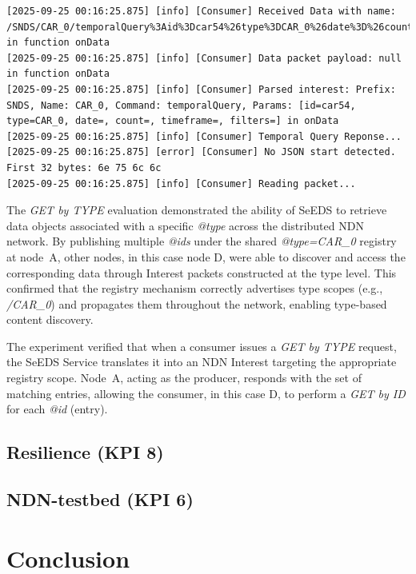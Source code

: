 \documentclass{article}
\begin{document}
\begin{lstlisting}[language=log, caption={D's log after receiving the registry payload, which are the \textit{@ids}, and performing a \emph{GET by ID} for each},label={lst:get-by-id-after-get-by-type-d}]
[2025-09-25 00:16:25.875] [info] [Consumer] Received Data with name: /SNDS/CAR_0/temporalQuery%3Aid%3Dcar54%26type%3DCAR_0%26date%3D%26count%3D%26timeframe%3D%26filters%3D in function onData
[2025-09-25 00:16:25.875] [info] [Consumer] Data packet payload: null in function onData
[2025-09-25 00:16:25.875] [info] [Consumer] Parsed interest: Prefix: SNDS, Name: CAR_0, Command: temporalQuery, Params: [id=car54, type=CAR_0, date=, count=, timeframe=, filters=] in onData
[2025-09-25 00:16:25.875] [info] [Consumer] Temporal Query Reponse...
[2025-09-25 00:16:25.875] [error] [Consumer] No JSON start detected. First 32 bytes: 6e 75 6c 6c 
[2025-09-25 00:16:25.875] [info] [Consumer] Reading packet...
\end{lstlisting}

The \textit{GET by TYPE} evaluation demonstrated the ability of SeEDS to retrieve data objects associated with a specific \textit{@type} across the distributed NDN network. By publishing multiple \textit{@ids} under the shared \textit{@type=CAR\_0} registry at node~A, other nodes, in this case node D, were able to discover and access the corresponding data through Interest packets constructed at the type level. This confirmed that the registry mechanism correctly advertises type scopes (e.g., \textit{/CAR\_0}) and propagates them throughout the network, enabling type-based content discovery.

The experiment verified that when a consumer issues a \textit{GET by TYPE} request, the SeEDS Service translates it into an NDN Interest targeting the appropriate registry scope. Node~A, acting as the producer, responds with the set of matching entries, allowing the consumer, in this case D, to perform a \emph{GET by ID} for each \textit{@id} (entry).

\subsection{Resilience (KPI 8)}
\subsection{NDN-testbed (KPI 6)}
\section{Conclusion}
\end{document}
